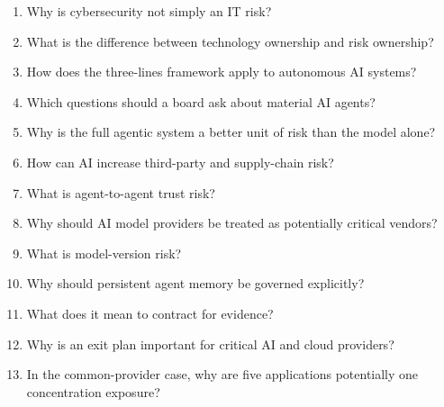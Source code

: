 \begin{enumerate}
    \item Why is cybersecurity not simply an IT risk?
    \item What is the difference between technology ownership and risk ownership?
    \item How does the three-lines framework apply to autonomous AI systems?
    \item Which questions should a board ask about material AI agents?
    \item Why is the full agentic system a better unit of risk than the model alone?
    \item How can AI increase third-party and supply-chain risk?
    \item What is agent-to-agent trust risk?
    \item Why should AI model providers be treated as potentially critical vendors?
    \item What is model-version risk?
    \item Why should persistent agent memory be governed explicitly?
    \item What does it mean to contract for evidence?
    \item Why is an exit plan important for critical AI and cloud providers?
    \item In the common-provider case, why are five applications potentially one concentration exposure?
\end{enumerate}
